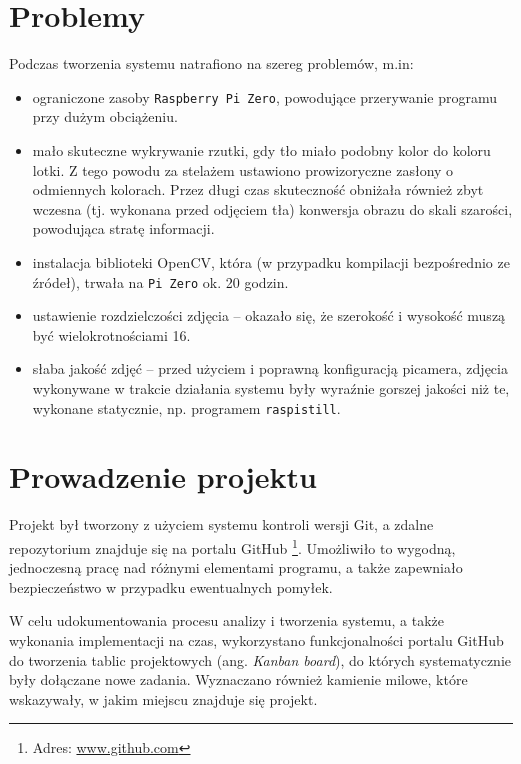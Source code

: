 \section{Problemy}
Podczas tworzenia systemu natrafiono na szereg problemów, m.in:
\begin{itemize}
  \item ograniczone zasoby \verb|Raspberry Pi Zero|, powodujące przerywanie programu przy dużym obciążeniu.
  \item mało skuteczne wykrywanie rzutki, gdy tło miało podobny kolor do koloru lotki. Z tego powodu za stelażem ustawiono prowizoryczne zasłony o odmiennych kolorach. Przez długi czas skuteczność obniżała również zbyt wczesna (tj. wykonana przed odjęciem tła) konwersja obrazu do skali szarości, powodująca stratę informacji.
  \item instalacja biblioteki OpenCV, która (w przypadku kompilacji bezpośrednio ze źródeł), trwała na \verb|Pi Zero| ok. 20 godzin.
  \item ustawienie rozdzielczości zdjęcia -- okazało się, że szerokość i wysokość muszą być wielokrotnościami 16.
  \item słaba jakość zdjęć -- przed użyciem i poprawną konfiguracją picamera, zdjęcia wykonywane w trakcie działania systemu były wyraźnie gorszej jakości niż te, wykonane statycznie, np. programem \verb|raspistill|.
\end{itemize}
\section{Prowadzenie projektu}
Projekt był tworzony z użyciem systemu kontroli wersji Git, a zdalne repozytorium znajduje się na portalu GitHub \footnote{Adres: \url{www.github.com}}. Umożliwiło to wygodną, jednoczesną pracę nad różnymi elementami programu, a także zapewniało bezpieczeństwo w przypadku ewentualnych pomyłek.

W celu udokumentowania procesu analizy i tworzenia systemu, a także wykonania implementacji na czas, wykorzystano funkcjonalności portalu GitHub do tworzenia tablic projektowych (ang. \textit{Kanban board}), do których systematycznie były dołączane nowe zadania. Wyznaczano również kamienie milowe, które wskazywały, w jakim miejscu znajduje się projekt. 